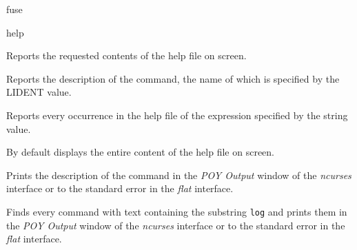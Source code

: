\begin{command}{fuse}{}
\begin{poyexamples}
\end{poyexamples}

\begin{poyalso}
\end{poyalso}

\end{command}


\begin{command}{help}{}


\begin{poydescription}
Reports the requested contents of the help file on screen.
\end{poydescription}

\begin{arguments}
{Reports the description of the command, the name of which is specified by the
LIDENT value.}
{}

{Reports every occurrence in the help file of the expression specified by the string value.}
{}
\end{arguments}

\poydefaults{}
{By default \poy displays the entire content of the help file on screen.}

\begin{poyexamples}
{Prints the description of the command
 in the \emph{POY Output} window of the \emph{ncurses}
interface or to the standard error in the \emph{flat} interface.}

{Finds every command with text containing the substring \texttt{log} and
prints them in the \emph{POY Output} window of the \emph{ncurses}
interface or to the standard error in the \emph{flat} interface.}

\end{poyexamples}

\end{command}


